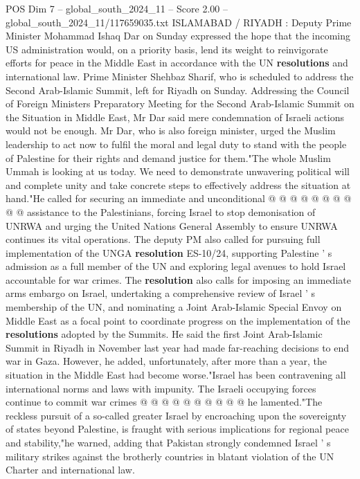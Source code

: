 \begin{textsample}{POS Dim 7 – global\_south\_2024\_11 – Score 2.00 – global\_south\_2024\_11/117659035.txt}  \label{ex:f7_pos_019}
ISLAMABAD / RIYADH : Deputy Prime Minister Mohammad Ishaq Dar on Sunday expressed the hope that the incoming US administration would, on a priority basis, lend its weight to reinvigorate efforts for peace in the Middle East in accordance with the UN \textbf{resolutions} and international law.
Prime Minister Shehbaz Sharif, who is scheduled to address the Second Arab-Islamic Summit, left for Riyadh on Sunday.
Addressing the Council of Foreign Ministers Preparatory Meeting for the Second Arab-Islamic Summit on the Situation in Middle East, Mr Dar said mere condemnation of Israeli actions would not be enough.
Mr Dar, who is also foreign minister, urged the Muslim leadership to act now to fulfil the moral and legal duty to stand with the people of Palestine for their rights and demand justice for them."The whole Muslim Ummah is looking at us today.
We need to demonstrate unwavering political will and complete unity and take concrete steps to effectively address the situation at hand."He called for securing an immediate and unconditional @ @ @ @ @ @ @ @ @ @ assistance to the Palestinians, forcing Israel to stop demonisation of UNRWA and urging the United Nations General Assembly to ensure UNRWA continues its vital operations.
The deputy PM also called for pursuing full implementation of the UNGA \textbf{resolution} ES-10/24, supporting Palestine ' s admission as a full member of the UN and exploring legal avenues to hold Israel accountable for war crimes.
The \textbf{resolution} also calls for imposing an immediate arms embargo on Israel, undertaking a comprehensive review of Israel ' s membership of the UN, and nominating a Joint Arab-Islamic Special Envoy on Middle East as a focal point to coordinate progress on the implementation of the \textbf{resolutions} adopted by the Summits.
He said the first Joint Arab-Islamic Summit in Riyadh in November last year had made far-reaching decisions to end war in Gaza.
However, he added, unfortunately, after more than a year, the situation in the Middle East had become worse."Israel has been contravening all international norms and laws with impunity.
The Israeli occupying forces continue to commit war crimes @ @ @ @ @ @ @ @ @ @ he lamented."The reckless pursuit of a so-called greater Israel by encroaching upon the sovereignty of states beyond Palestine, is fraught with serious implications for regional peace and stability,"he warned, adding that Pakistan strongly condemned Israel ' s military strikes against the brotherly countries in blatant violation of the UN Charter and international law.

\end{textsample}
